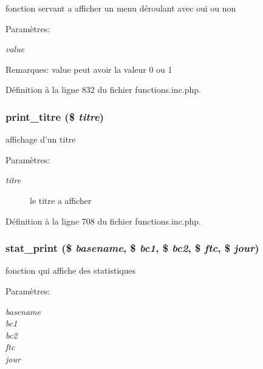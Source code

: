 fonction servant a afficher un menu d\'{e}roulant avec oui ou non 

\begin{Desc}
\item[Param\`{e}tres:]
\begin{description}
\item[{\em value}]\end{description}
\end{Desc}
\begin{Desc}
\item[Remarques:]value peut avoir la valeur 0 ou 1 \end{Desc}


D\'{e}finition \`{a} la ligne 832 du fichier functions.inc.php.\hypertarget{functions_8inc_8php_a28}{
\subsubsection[print\_\-titre]{\setlength{\rightskip}{0pt plus 5cm}print\_\-titre (\$ {\em titre})}}
\label{functions_8inc_8php_a28}


affichage d'un titre 

\begin{Desc}
\item[Param\`{e}tres:]
\begin{description}
\item[{\em titre}]le titre a afficher \end{description}
\end{Desc}


D\'{e}finition \`{a} la ligne 708 du fichier functions.inc.php.\hypertarget{functions_8inc_8php_a42}{
\subsubsection[stat\_\-print]{\setlength{\rightskip}{0pt plus 5cm}stat\_\-print (\$ {\em basename}, \$ {\em bc1}, \$ {\em bc2}, \$ {\em ftc}, \$ {\em jour})}}
\label{functions_8inc_8php_a42}


fonction qui affiche des statistiques 

\begin{Desc}
\item[Param\`{e}tres:]
\begin{description}
\item[{\em basename}]\item[{\em bc1}]\item[{\em bc2}]\item[{\em ftc}]\item[{\em jour}]\end{description}
\end{Desc}


